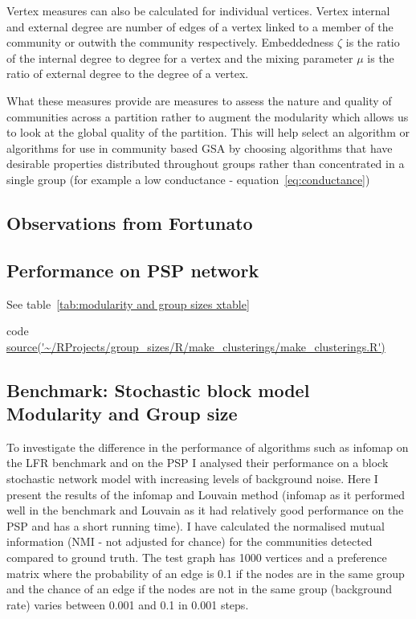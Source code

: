 Vertex measures can also be calculated for individual vertices. Vertex internal and external degree are number of edges of a vertex linked to a member of the community or outwith the community respectively. Embeddedness $\zeta$ is the ratio of the internal degree to degree for a vertex and the mixing parameter $\mu$ is the ratio of external degree to the degree of a vertex\cite{fortunato2016community}.

What these measures provide are measures to assess the nature and quality of communities across a partition rather to augment the modularity which allows us to look at the global quality of the partition. This will help select an algorithm or algorithms for use in community based GSA by choosing algorithms that have desirable properties distributed throughout groups rather than concentrated in a single group (for example a low conductance - equation~\ref{eq:conductance})
\subsection{Observations from Fortunato}

\subsection{Performance on PSP network}
\label{sec:Performance on PSP network}
See table~\ref{tab:modularity and group sizes xtable} 

code \url{source('~/RProjects/group_sizes/R/make_clusterings/make_clusterings.R')}



\subsection{Benchmark: Stochastic block model Modularity and Group size}
\label{sec:benchmark sbm}

To investigate the difference in the performance of algorithms such as infomap on the LFR benchmark and on the PSP I analysed their performance on a block stochastic network model with increasing levels of background noise. Here I present the results of the infomap and Louvain method (infomap as it performed well in the benchmark and Louvain as it had relatively good performance on the PSP and has a short running time). I have calculated the normalised mutual information (NMI - not adjusted for chance) for the communities detected compared to ground truth. The test graph has 1000 vertices and a preference matrix where the probability of an edge is 0.1 if the nodes are in the same group and the chance of an edge if the nodes are not in the same group (background rate) varies between 0.001 and 0.1 in 0.001 steps.

